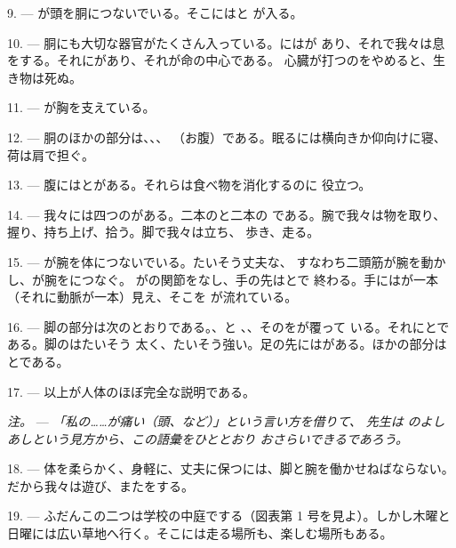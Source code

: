 9. --- が頭を胴につないでいる。そこにはと
が入る。

10. --- 胴にも大切な器官がたくさん入っている。にはが
あり、それで我々は息をする。それにがあり、それが命の中心である。
心臓が打つのをやめると、生き物は死ぬ。

11. --- が胸を支えている。

12. --- 胴のほかの部分は、、、
（お腹）である。眠るには横向きか仰向けに寝、荷は肩で担ぐ。

13. --- 腹にはとがある。それらは食べ物を消化するのに
役立つ。

\VUsaut{4.4mm}
\VUsaut{3.0mm}

14. --- 我々には四つのがある。二本のと二本の
である。腕で我々は物を取り、握り、持ち上げ、拾う。脚で我々は立ち、
歩き、走る。

15. --- が腕を体につないでいる。たいそう丈夫な、
すなわち二頭筋が腕を動かし、が腕をにつなぐ。
がの関節をなし、手の先はとで
終わる。手にはが一本（それに動脈が一本）見え、そこを
が流れている。

16. --- 脚の部分は次のとおりである。、と
、、そのをが覆って
いる。それにとである。脚のはたいそう
太く、たいそう強い。足の先にはがある。ほかの部分は
とである。

17. --- 以上が人体のほぼ完全な説明である。

\textit{注。} --- \textit{「私の……が痛い（頭、など）」という言い方を借りて、
先生は} \textit{のよしあしという見方から、この語彙をひととおり
おさらいできるであろう。}

\VUsaut{5.0mm}
\VUsaut{2.4mm}
\VUsaut{3.0mm}

18. --- 体を柔らかく、身軽に、丈夫に保つには、脚と腕を働かせねばならない。
だから我々は遊び、またをする。

19. --- ふだんこの二つは学校の中庭でする（図表第 1 号を見よ）。しかし木曜と
日曜には広い草地へ行く。そこには走る場所も、楽しむ場所もある。

